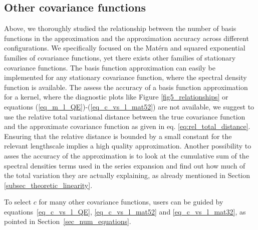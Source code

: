 \subsection{Other covariance functions}

Above, we thoroughly studied the relationship between the number of basis functions in the approximation and the approximation accuracy across different configurations. We specifically focused on the Matérn and squared exponential families of covariance functions, yet there exists other families of stationary covariance functions. The basis function approximation can easily be implemented for any stationary covariance function, where the spectral density function is available. The assess the accuracy of a basis function approximation for a kernel, where the diagnostic plots like Figure \ref{fig5_relationships} or equations (\ref{eq_m_l_QE})-(\ref{eq_c_vs_l_mat52}) are not available, we suggest to use the relative total variational distance between the true covariance function and the approximate covariance function as given in eq. \eqref{eq:rel_total_distance}. Ensuring that the relative distance is bounded by a small constant for the relevant lengthscale implies a high quality approximation. Another possibility to asses the accuracy of the approximation is to look at the cumulative sum of the spectral densities terms used in the series expansion and find out how much of the total variation they are actually explaining{\color{blue}, as already mentioned in Section \ref{subsec_theoretic_linearity}}. 

To select $c$ for many other covariance functions, users can be guided by equations~\eqref{eq_c_vs_l_QE}, \eqref{eq_c_vs_l_mat52} and \eqref{eq_c_vs_l_mat32}, as pointed in Section~\ref{sec_num_equations}.

